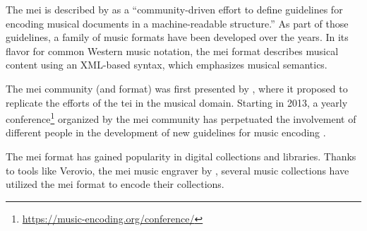 

The \gls{mei} is described by \textcite{hankinson2011music}
as a ``community-driven effort to define guidelines for
encoding musical documents in a machine-readable
structure.'' As part of those guidelines, a family of music
formats have been developed over the years. In its flavor
for common Western music notation, the \gls{mei} format
describes musical content using an XML-based syntax, which
emphasizes musical semantics.


The \gls{mei} community (and format) was first presented by
\textcite{roland2002music}, where it proposed to replicate
the efforts of the \gls{tei} in the musical domain. Starting
in 2013, a yearly
conference\footnote{\href{https://music-encoding.org/conference/}{https://music-encoding.org/conference/}}
organized by the \gls{mei} community has perpetuated the
involvement of different people in the development of new
guidelines for music encoding
\parencite{crawford2016review}.


The \gls{mei} format has gained popularity in digital
collections and libraries. Thanks to tools like Verovio, the
\gls{mei} music engraver by \textcite{pugin2014verovio},
several music collections have utilized the \gls{mei} format
to encode their collections.

